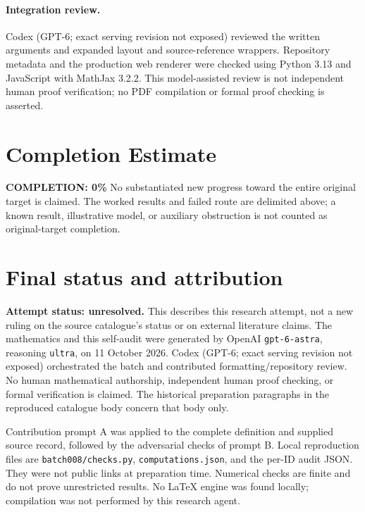 \documentclass[11pt]{article}
\begin{document}
\paragraph{Integration review.} Codex (GPT-6; exact serving revision not exposed) reviewed the written arguments and expanded layout and source-reference wrappers. Repository metadata and the production web renderer were checked using Python 3.13 and JavaScript with MathJax 3.2.2. This model-assisted review is not independent human proof verification; no PDF compilation or formal proof checking is asserted.

\section{Completion Estimate}
\noindent\textbf{COMPLETION: 0\%}
No substantiated new progress toward the entire original target is claimed. The worked results and failed route are delimited above; a known result, illustrative model, or auxiliary obstruction is not counted as original-target completion.

\section{Final status and attribution}
\textbf{Attempt status: unresolved.} This describes this research attempt, not a new ruling on the source catalogue's status or on external literature claims.
The mathematics and this self-audit were generated by OpenAI \texttt{gpt-6-astra}, reasoning \texttt{ultra}, on 11 October 2026. Codex (GPT-6; exact serving revision not exposed) orchestrated the batch and contributed formatting/repository review. No human mathematical authorship, independent human proof checking, or formal verification is claimed. The historical preparation paragraphs in the reproduced catalogue body concern that body only.

Contribution prompt A was applied to the complete definition and supplied source record, followed by the adversarial checks of prompt B. Local reproduction files are \texttt{batch008/checks.py}, \texttt{computations.json}, and the per-ID audit JSON. They were not public links at preparation time. Numerical checks are finite and do not prove unrestricted results. No LaTeX engine was found locally; compilation was not performed by this research agent.
\end{document}
